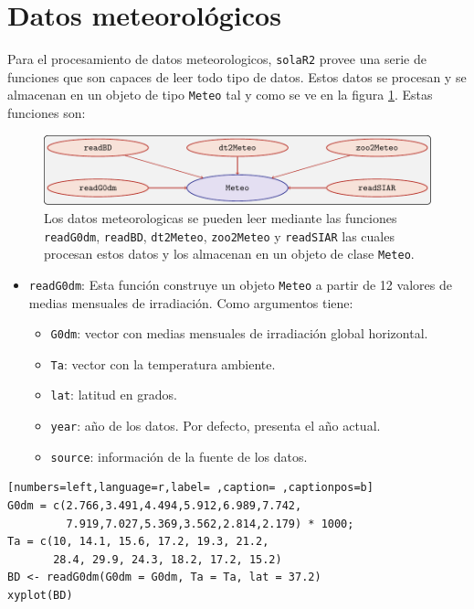 \section{Datos meteorológicos}
\label{sec:org1afc895}
\label{sec:datos-meteorologicos}
Para el procesamiento de datos meteorologicos, \texttt{solaR2} provee una serie de funciones que son capaces de leer todo tipo de datos. Estos datos se procesan y se almacenan en un objeto de tipo \texttt{Meteo} tal y como se ve en la figura \ref{fig:meteo}. Estas funciones son:
\begin{figure}[htbp]
\centering
\includegraphics[keepaspectratio,width=\textwidth,height=0.5\textheight]{figuras/meteo.pdf}
\caption{Los datos meteorologicas se pueden leer mediante las funciones \texttt{readG0dm}, \texttt{readBD}, \texttt{dt2Meteo}, \texttt{zoo2Meteo} y \texttt{readSIAR} las cuales procesan estos datos y los almacenan en un objeto de clase \texttt{Meteo}. \label{fig:meteo}}
\end{figure}
\begin{itemize}
\item \texttt{readG0dm}: Esta función construye un objeto \texttt{Meteo} a partir de 12 valores de medias mensuales de irradiación.
Como argumentos tiene:
\begin{itemize}
\item \texttt{G0dm}: vector con medias mensuales de irradiación global horizontal.
\item \texttt{Ta}: vector con la temperatura ambiente.
\item \texttt{lat}: latitud en grados.
\item \texttt{year}: año de los datos. Por defecto, presenta el año actual.
\item \texttt{source}: información de la fuente de los datos.
\end{itemize}
\end{itemize}
\begin{lstlisting}[numbers=left,language=r,label= ,caption= ,captionpos=b]
G0dm = c(2.766,3.491,4.494,5.912,6.989,7.742,
         7.919,7.027,5.369,3.562,2.814,2.179) * 1000;
Ta = c(10, 14.1, 15.6, 17.2, 19.3, 21.2,
       28.4, 29.9, 24.3, 18.2, 17.2, 15.2)
BD <- readG0dm(G0dm = G0dm, Ta = Ta, lat = 37.2)
xyplot(BD)
\end{lstlisting}

